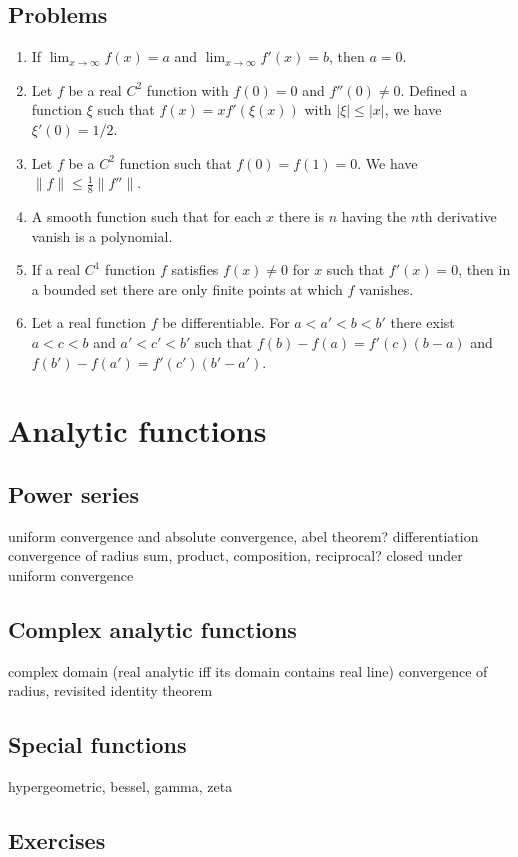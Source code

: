 \documentclass{../note}
\begin{document}
\section*{Problems}
\begin{enumerate}
\item If $\lim_{x\to\infty}f(x)=a$ and $\lim_{x\to\infty}f'(x)=b$, then $a=0$.
\item Let $f$ be a real $C^2$ function with $f(0)=0$ and $f''(0)\ne0$.
Defined a function $\xi$ such that $f(x)=xf'(\xi(x))$ with $|\xi|\le|x|$, we have $\xi'(0)=1/2$.
\item Let $f$ be a $C^2$ function such that $f(0)=f(1)=0$.
We have $\|f\|\le\frac18\|f''\|$.
\item A smooth function such that for each $x$ there is $n$ having the $n$th derivative vanish is a polynomial.
\item If a real $C^1$ function $f$ satisfies $f(x)\ne0$ for $x$ such that $f'(x)=0$, then in a bounded set there are only finite points at which $f$ vanishes.
\item Let a real function $f$ be differentiable.
For $a<a'<b<b'$ there exist $a<c<b$ and $a'<c'<b'$ such that $f(b)-f(a)=f'(c)(b-a)$ and $f(b')-f(a')=f'(c')(b'-a')$.
\end{enumerate}


\chapter{Analytic functions}
\section{Power series}
uniform convergence and absolute convergence, abel theorem?
differentiation
convergence of radius
sum, product, composition, reciprocal?
closed under uniform convergence
\section{Complex analytic functions}
complex domain
(real analytic iff its domain contains real line)
convergence of radius, revisited
identity theorem
\section{Special functions}
hypergeometric, bessel, gamma, zeta

\section*{Exercises}
\end{document}
